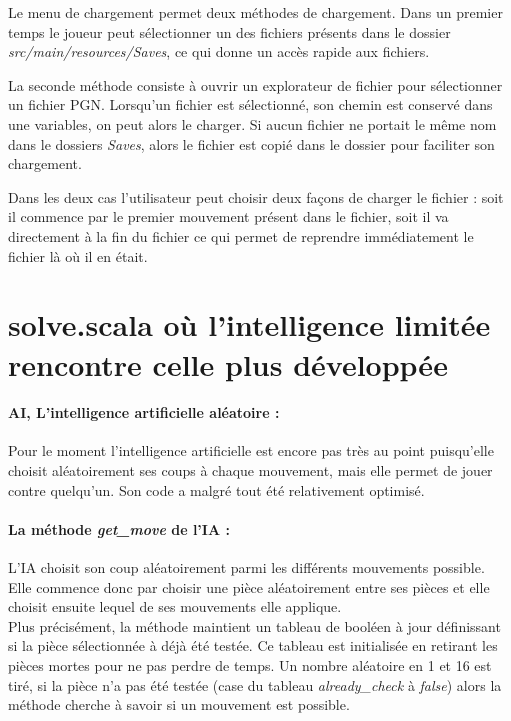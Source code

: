 \documentclass[a4paper]{article}
\begin{document}
Le menu de chargement permet deux méthodes de chargement. Dans un premier temps le joueur peut sélectionner un des fichiers présents dans le dossier \textit{src/main/resources/Saves}, ce qui donne un accès rapide aux fichiers. 

La seconde méthode consiste à ouvrir un explorateur de fichier pour sélectionner un fichier PGN. Lorsqu'un fichier est sélectionné, son chemin est conservé dans une variables, on peut alors le charger. Si aucun fichier ne portait le même nom dans le dossiers \textit{Saves}, alors le fichier est copié dans le dossier pour faciliter son chargement. 

Dans les deux cas l'utilisateur peut choisir deux façons de charger le fichier : soit il commence par le premier mouvement présent dans le fichier, soit il va directement à la fin du fichier ce qui permet de reprendre immédiatement le fichier là où il en était. 

\section{solve.scala où l'intelligence limitée rencontre celle plus développée}

\paragraph{AI, L'intelligence artificielle aléatoire :}Pour le moment l'intelligence artificielle est encore pas très au point puisqu'elle choisit aléatoirement ses coups à chaque mouvement, mais elle permet de jouer contre quelqu'un. Son code a malgré tout été relativement optimisé. 

\paragraph{La méthode \textit{get\_move} de l'IA :}L'IA choisit son coup aléatoirement parmi les différents mouvements possible. Elle commence donc par choisir une pièce aléatoirement entre ses pièces et elle choisit ensuite lequel de ses mouvements elle applique. \\ 

Plus précisément, la méthode maintient un tableau de booléen à jour définissant si la pièce sélectionnée à déjà été testée. Ce tableau est initialisée en retirant les pièces mortes pour ne pas perdre de temps. Un nombre aléatoire en 1 et 16 est tiré, si la pièce n'a pas été testée (case du tableau \textit{already\_check} à \textit{false}) alors la méthode cherche à savoir si un mouvement est possible. \\
\end{document}
